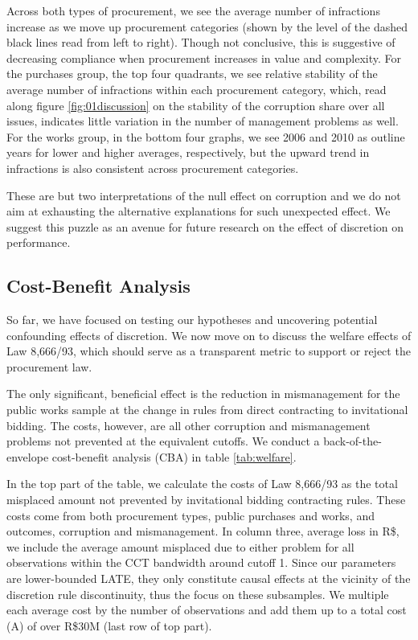 \documentclass[11pt]{article}
\begin{document}
Across both types of procurement, we see the average number of infractions increase as we move up procurement categories (shown by the level of the dashed black lines read from left to right). Though not conclusive, this is suggestive of decreasing compliance when procurement increases in value and complexity. For the purchases group, the top four quadrants, we see relative stability of the average number of infractions within each procurement category, which, read along figure \ref{fig:01discussion} on the stability of the corruption share over all issues, indicates little variation in the number of management problems as well. For the works group, in the bottom four graphs, we see 2006 and 2010 as outline years for lower and higher averages, respectively, but the upward trend in infractions is also consistent across procurement categories.

These are but two interpretations of the null effect on corruption and we do not aim at exhausting the alternative explanations for such unexpected effect. We suggest this puzzle as an avenue for future research on the effect of discretion on performance.

\subsection{Cost-Benefit Analysis} \label{subsec:cba}

So far, we have focused on testing our hypotheses and uncovering potential confounding effects of discretion. We now move on to discuss the welfare effects of Law 8,666/93, which should serve as a transparent metric to support or reject the procurement law.

The only significant, beneficial effect is the reduction in mismanagement for the public works sample at the change in rules from direct contracting to invitational bidding. The costs, however, are all other corruption and mismanagement problems not prevented at the equivalent cutoffs. We conduct a back-of-the-envelope cost-benefit analysis (CBA) in table \ref{tab:welfare}.

In the top part of the table, we calculate the costs of Law 8,666/93 as the total misplaced amount not prevented by invitational bidding contracting rules. These costs come from both procurement types, public purchases and works, and outcomes, corruption and mismanagement. In column three, average loss in R\$, we include the average amount misplaced due to either problem for all observations within the CCT bandwidth around cutoff 1. Since our parameters are lower-bounded LATE, they only constitute causal effects at the vicinity of the discretion rule discontinuity, thus the focus on these subsamples. We multiple each average cost by the number of observations and add them up to a total cost (A) of over R\$30M (last row of top part).
\end{document}
